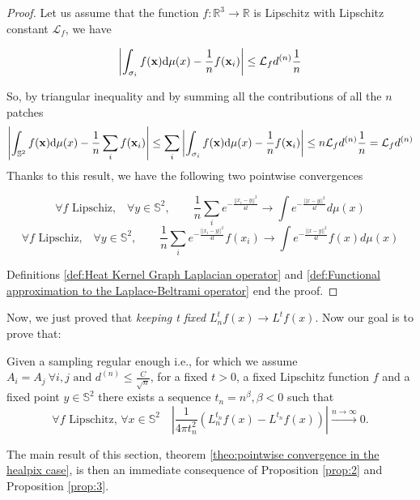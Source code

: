 \begin{proof}
	Let us assume that the function $f:\mathbb R^3\rightarrow \mathbb R$ is Lipschitz with Lipschitz constant $\mathcal L_f$, we have 
	
	$$\left| \int_{\sigma_{i}}f({\bf x})\text{d}{\mu(x)} - \frac{1}{n}f(\mathbf x_i)\right| \leq \mathcal L_fd^{(n)}\frac{1}{n} $$

	So, by triangular inequality and by summing all the contributions of all the $n$ patches
	$$\left| \int_{\mathbb S^2}f({\bf x})\text{d}{\mu(x)} - \frac{1}{n}\sum_i f(\mathbf x_i)\right| \leq \sum_i \left| \int_{\sigma_{i}}f({\bf x})\text{d}{\mu(x)} - \frac{1}{n}f(\mathbf x_i)\right|\leq n  \mathcal L_fd^{(n)}\frac{1}{n} = \mathcal L_fd^{(n)}$$	
	Thanks to this result, we have the following two pointwise convergences
	
	$$\forall f \text{ Lipschiz,}\quad \forall y\in\mathbb S^2,  \quad\quad \frac{1}{n}\sum_i e^{-\frac{||x_i-y||^2}{4t}}\rightarrow \int e^{-\frac{||x-y||^2}{4t}}d\mu(x)$$
	$$\forall f \text{ Lipschiz,}\quad \forall y\in\mathbb S^2,  \quad\quad \frac{1}{n}\sum_i e^{-\frac{||x_i-y||^2}{4t}}f(x_i)\rightarrow \int e^{-\frac{||x-y||^2}{4t}}f(x)d\mu(x)$$
	
	Definitions \ref{def:Heat Kernel Graph Laplacian operator} and \ref{def:Functional approximation to the Laplace-Beltrami operator} end the proof.
\end{proof}
\vspace{0.5cm}

Now, we just proved that \textit{keeping t fixed} $L_n^tf(x)\rightarrow L^tf(x)$. Now our goal is to prove that:

\vspace{0.5cm}
\begin{prop}\label{prop:2}
	Given a sampling regular enough i.e., for which we assume $A_i=A_j \ \forall i,j\text{ and }d^{(n)}\leq \frac{C}{\sqrt{n}}$, for a fixed $t>0$, a fixed Lipschitz function $f$ and a fixed point $y\in\mathbb S^2$ there exists a sequence $t_n = n^\beta, \beta<0$ such that 
$$
\forall f \text{ Lipschitz, } \forall x\in\mathbb S^2 \quad \left|\frac{1}{4\pi t_n^2}\left(L_n^{t_n}f(x) - L^{t_n}f(x)\right)\right|\xrightarrow{n\to \infty}0.
$$
\end{prop}
\vspace{0.5cm}

The main result of this section, theorem  \ref{theo:pointwise convergence in the healpix case}, is then an immediate consequence of Proposition \ref{prop:2} and Proposition \ref{prop:3}.


